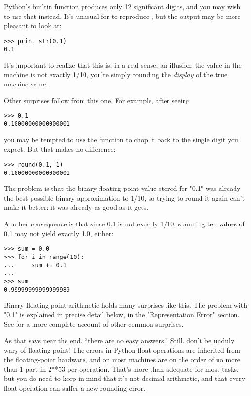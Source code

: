 \documentclass{manual}
\begin{document}
Python's builtin  function produces only 12
significant digits, and you may wish to use that instead.  It's
unusual for  to reproduce , but the
output may be more pleasant to look at:

\begin{verbatim}
>>> print str(0.1)
0.1
\end{verbatim}

It's important to realize that this is, in a real sense, an illusion:
the value in the machine is not exactly 1/10, you're simply rounding
the \emph{display} of the true machine value.

Other surprises follow from this one.  For example, after seeing

\begin{verbatim}
>>> 0.1
0.10000000000000001
\end{verbatim}

you may be tempted to use the  function to chop it
back to the single digit you expect.  But that makes no difference:

\begin{verbatim}
>>> round(0.1, 1)
0.10000000000000001
\end{verbatim}

The problem is that the binary floating-point value stored for "0.1"
was already the best possible binary approximation to 1/10, so trying
to round it again can't make it better:  it was already as good as it
gets.

Another consequence is that since 0.1 is not exactly 1/10,
summing ten values of 0.1 may not yield exactly 1.0, either:

\begin{verbatim}
>>> sum = 0.0
>>> for i in range(10):
...     sum += 0.1
...
>>> sum
0.99999999999999989
\end{verbatim}

Binary floating-point arithmetic holds many surprises like this.  The
problem with "0.1" is explained in precise detail below, in the
"Representation Error" section.  See
 for a more complete account of other common surprises.

As that says near the end, ``there are no easy answers.''  Still,
don't be unduly wary of floating-point!  The errors in Python float
operations are inherited from the floating-point hardware, and on most
machines are on the order of no more than 1 part in 2**53 per
operation.  That's more than adequate for most tasks, but you do need
to keep in mind that it's not decimal arithmetic, and that every float
operation can suffer a new rounding error.
\end{document}
